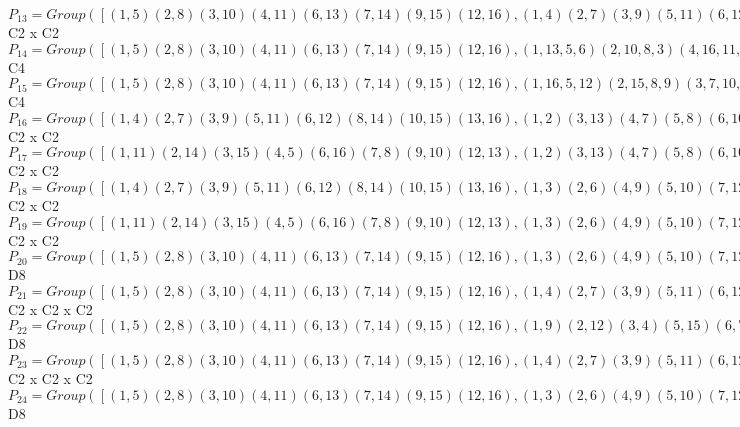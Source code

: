 \documentclass[varwidth=\maxdimen,border=10]{standalone}
\begin{document}
\begin{tabular}
$P_{13} = Group( [ ( 1, 5)( 2, 8)( 3,10)( 4,11)( 6,13)( 7,14)( 9,15)(12,16), ( 1, 4)( 2, 7)( 3, 9)( 5,11)( 6,12)( 8,14)(10,15)(13,16) ] )\cong$ C2 x C2\ \\
$P_{14} = Group( [ ( 1, 5)( 2, 8)( 3,10)( 4,11)( 6,13)( 7,14)( 9,15)(12,16), ( 1,13, 5, 6)( 2,10, 8, 3)( 4,16,11,12)( 7,15,14, 9) ] )\cong$ C4\ \\
$P_{15} = Group( [ ( 1, 5)( 2, 8)( 3,10)( 4,11)( 6,13)( 7,14)( 9,15)(12,16), ( 1,16, 5,12)( 2,15, 8, 9)( 3, 7,10,14)( 4,13,11, 6) ] )\cong$ C4\ \\
$P_{16} = Group( [ ( 1, 4)( 2, 7)( 3, 9)( 5,11)( 6,12)( 8,14)(10,15)(13,16), ( 1, 2)( 3,13)( 4, 7)( 5, 8)( 6,10)( 9,16)(11,14)(12,15) ] )\cong$ C2 x C2\ \\
$P_{17} = Group( [ ( 1,11)( 2,14)( 3,15)( 4, 5)( 6,16)( 7, 8)( 9,10)(12,13), ( 1, 2)( 3,13)( 4, 7)( 5, 8)( 6,10)( 9,16)(11,14)(12,15) ] )\cong$ C2 x C2\ \\
$P_{18} = Group( [ ( 1, 4)( 2, 7)( 3, 9)( 5,11)( 6,12)( 8,14)(10,15)(13,16), ( 1, 3)( 2, 6)( 4, 9)( 5,10)( 7,12)( 8,13)(11,15)(14,16) ] )\cong$ C2 x C2\ \\
$P_{19} = Group( [ ( 1,11)( 2,14)( 3,15)( 4, 5)( 6,16)( 7, 8)( 9,10)(12,13), ( 1, 3)( 2, 6)( 4, 9)( 5,10)( 7,12)( 8,13)(11,15)(14,16) ] )\cong$ C2 x C2\ \\
$P_{20} = Group( [ ( 1, 5)( 2, 8)( 3,10)( 4,11)( 6,13)( 7,14)( 9,15)(12,16), ( 1, 3)( 2, 6)( 4, 9)( 5,10)( 7,12)( 8,13)(11,15)(14,16), ( 1, 2)( 3,13)( 4, 7)( 5, 8)( 6,10)( 9,16)(11,14)(12,15) ] )\cong$ D8\ \\
$P_{21} = Group( [ ( 1, 5)( 2, 8)( 3,10)( 4,11)( 6,13)( 7,14)( 9,15)(12,16), ( 1, 4)( 2, 7)( 3, 9)( 5,11)( 6,12)( 8,14)(10,15)(13,16), ( 1, 2)( 3,13)( 4, 7)( 5, 8)( 6,10)( 9,16)(11,14)(12,15) ] )\cong$ C2 x C2 x C2\ \\
$P_{22} = Group( [ ( 1, 5)( 2, 8)( 3,10)( 4,11)( 6,13)( 7,14)( 9,15)(12,16), ( 1, 9)( 2,12)( 3, 4)( 5,15)( 6, 7)( 8,16)(10,11)(13,14), ( 1, 2)( 3,13)( 4, 7)( 5, 8)( 6,10)( 9,16)(11,14)(12,15) ] )\cong$ D8\ \\
$P_{23} = Group( [ ( 1, 5)( 2, 8)( 3,10)( 4,11)( 6,13)( 7,14)( 9,15)(12,16), ( 1, 4)( 2, 7)( 3, 9)( 5,11)( 6,12)( 8,14)(10,15)(13,16), ( 1, 3)( 2, 6)( 4, 9)( 5,10)( 7,12)( 8,13)(11,15)(14,16) ] )\cong$ C2 x C2 x C2\ \\
$P_{24} = Group( [ ( 1, 5)( 2, 8)( 3,10)( 4,11)( 6,13)( 7,14)( 9,15)(12,16), ( 1, 3)( 2, 6)( 4, 9)( 5,10)( 7,12)( 8,13)(11,15)(14,16), ( 1, 7)( 2, 4)( 3,16)( 5,14)( 6,15)( 8,11)( 9,13)(10,12) ] )\cong$ D8\ \\

\end{tabular}
\end{document}
